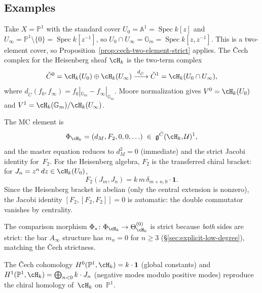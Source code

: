 \subsection{Examples}
\label{subsec:cech-hca-examples}

\begin{example}
\label{ex:cech-hca-heisenberg}
Take $X = \mathbb{P}^1$ with the standard cover
$U_0 = \mathbb{A}^1 = \operatorname{Spec}k[z]$ and
$U_\infty = \mathbb{P}^1 \setminus\{0\}
= \operatorname{Spec}k[z^{-1}]$,
so $U_0 \cap U_\infty = \mathbb{G}_m
= \operatorname{Spec}k[z,z^{-1}]$.
This is a two-element cover, so
Proposition~\ref{prop:cech-two-element-strict} applies. The \v{C}ech
complex for the Heisenberg sheaf $\cH_k$ is the two-term complex
\[
\check{C}^0 = \cH_k(U_0) \oplus \cH_k(U_\infty)
\xrightarrow{\;d_{\check{C}}\;}
\check{C}^1 = \cH_k(U_0 \cap U_\infty),
\]
where $d_{\check{C}}(f_0,f_\infty) = f_0|_{\mathbb{G}_m}
- f_\infty|_{\mathbb{G}_m}$.
Moore normalization gives $V^0 = \cH_k(U_0)$ and
$V^1 = \cH_k(\mathbb{G}_m)/\cH_k(U_\infty)$.

The MC element is
\begin{equation}\label{eq:heisenberg-cech-mc}
\Phi_{\cH_k} = (d_M, F_2, 0, 0, \ldots)
 \;\in\; \mathfrak{g}^{\check{C}}(\cH_k,\mathcal{U})^1,
\end{equation}
and the master equation reduces to $d_M^2 = 0$ (immediate) and
the strict Jacobi identity for~$F_2$. For the Heisenberg algebra,
$F_2$ is the transferred chiral bracket: for
$J_n = z^n\,dz \in \cH_k(U_0)$,
\[
F_2(J_m, J_n) = k\,m\,\delta_{m+n,0}\cdot\mathbf{1}.
\]
Since the Heisenberg bracket is abelian (only the central
extension is nonzero), the Jacobi identity $[F_2,[F_2,F_2]] = 0$
is automatic: the double commutator vanishes by centrality.

The comparison morphism $\Phi_*\colon \Phi_{\cH_k} \to
\Theta^{(0)}_{\cH_k}$ is strict because \emph{both} sides are
strict: the bar $A_\infty$ structure has $m_n = 0$ for $n \geq 3$
(\S\ref{sec:explicit-low-degree}), matching the \v{C}ech
strictness.

The \v{C}ech cohomology
$H^0(\mathbb{P}^1,\cH_k) = k\cdot\mathbf{1}$ (global constants) and
$H^1(\mathbb{P}^1,\cH_k) = \bigoplus_{n<0} k\cdot J_n$
(negative modes modulo positive modes) reproduce
the chiral homology of~$\cH_k$ on~$\mathbb{P}^1$.
\end{example}

